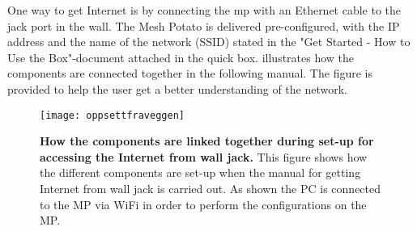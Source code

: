 One way to get Internet is by connecting the \gls{mp} with an Ethernet cable to the jack port in the wall. The Mesh Potato is delivered pre-configured, with the IP address and the name of the network (SSID) stated in the "Get Started - How to Use the Box"-document attached in the \gls{quick} box.  illustrates how the components are connected together in the following manual. The figure is provided to help the user get a better understanding of the network.  

\begin{figure}[h!]
  \centering
      \texttt{[image: oppsettfraveggen]}
  \caption [How the components are linked together during set-up for accessing the Internet from wall jack]{\textbf{How the components are linked together during set-up for accessing the Internet from wall jack.} This figure shows how the different components are set-up when the manual for getting Internet from wall jack is carried out. As shown the PC is connected to the MP via WiFi in order to perform the configurations on the MP.}
  \label{fig:oppsettfraveggen}
\end{figure}




